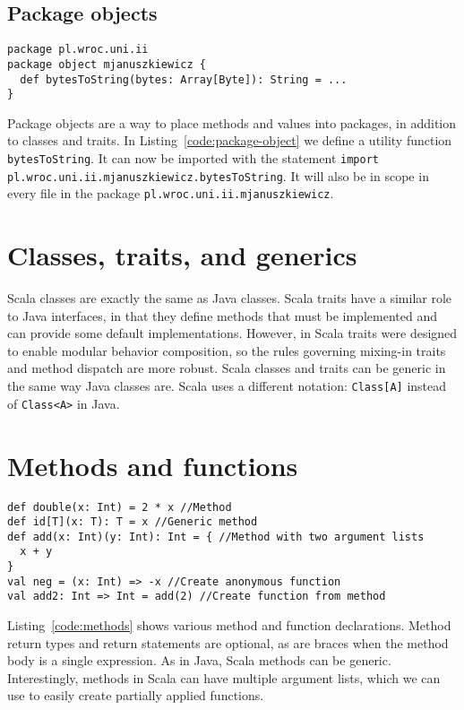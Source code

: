 \subsection{Package objects}

\begin{lstlisting}[caption=Package object, label=code:package-object, escapechar=|]
package pl.wroc.uni.ii
package object mjanuszkiewicz {
  def bytesToString(bytes: Array[Byte]): String = ...
}
\end{lstlisting}

Package objects are a way to place methods and values into packages, in addition to classes and traits.
In Listing~\ref{code:package-object} we define a utility function \lstinline|bytesToString|.
It can now be imported with the statement \lstinline|import pl.wroc.uni.ii.mjanuszkiewicz.bytesToString|.
It will also be in scope in every file in the package \lstinline|pl.wroc.uni.ii.mjanuszkiewicz|.

\section{Classes, traits, and generics}

Scala classes are exactly the same as Java classes.
Scala traits have a similar role to Java interfaces, in that they define methods that must be implemented and can provide some default implementations.
However, in Scala traits were designed to enable modular behavior composition, so the rules governing mixing-in traits and method dispatch are more robust.
Scala classes and traits can be generic in the same way Java classes are.
Scala uses a different notation: \lstinline|Class[A]| instead of \lstinline|Class<A>| in Java.

\section{Methods and functions}

\begin{lstlisting}[caption=Methods and functions, label=code:methods, escapechar=|]
def double(x: Int) = 2 * x //Method
def id[T](x: T): T = x //Generic method
def add(x: Int)(y: Int): Int = { //Method with two argument lists
  x + y
}
val neg = (x: Int) => -x //Create anonymous function
val add2: Int => Int = add(2) //Create function from method
\end{lstlisting}

Listing~\ref{code:methods} shows various method and function declarations.
Method return types and return statements are optional, as are braces when the method body is a single expression.
As in Java, Scala methods can be generic.
Interestingly, methods in Scala can have multiple argument lists, which we can use to easily create partially applied functions.

